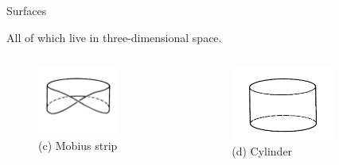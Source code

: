 \documentclass{beamer}
\begin{document}
\begin{frame}{Surfaces}
  \begin{block}{}
    All of which live in three-dimensional space.
  \end{block}
  \begin{columns}
    \begin{column}{0.5\textwidth}
      \begin{figure}
        \centering
        \includegraphics[width=0.7\textwidth]{figure_1_10_c.png}
        \caption{(c) Mobius strip}
      \end{figure}
    \end{column}
    \begin{column}{0.5\textwidth}
      \begin{figure}
        \centering
        \includegraphics[width=0.7\textwidth]{figure_1_10_d.png}
        \caption{(d) Cylinder}
      \end{figure}
    \end{column}
  \end{columns}
\end{frame}
\end{document}
